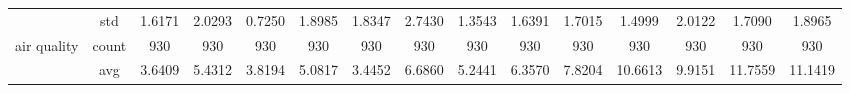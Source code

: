 \begin{table}[htbp]
{\begin{tabular}{rcccc|c|c|c|c|c|ccccc}
			                                                                               & std                                    & 1.6171                                                                             & 2.0293                                                                    & 0.7250                                                                    & 1.8985                                         & 1.8347                                                                    & 2.7430                                       & 1.3543                                      & 1.6391                                         & 1.7015                                         & 1.4999                                          & 2.0122                                          & 1.7090                                         & 1.8965                                         \\
			air quality                                                                    & count                                  & 930                                                                                & 930                                                                       & 930                                                                       & 930                                            & 930                                                                       & 930                                          & 930                                         & 930                                            & 930                                            & 930                                             & 930                                             & 930                                            & 930                                            \\
			                                                                               & avg                                    & 3.6409                                                                             & 5.4312                                                                    & 3.8194                                                                    & 5.0817                                         & \cellcolor[rgb]{ .776,  .937,  .808}\textcolor[rgb]{ 0,  .38,  0}{3.4452} & 6.6860                                       & 5.2441                                      & 6.3570                                         & 7.8204                                         & 10.6613                                         & 9.9151                                          & 11.7559                                        & 11.1419                                        \\

\end{tabular}}
\end{table}
